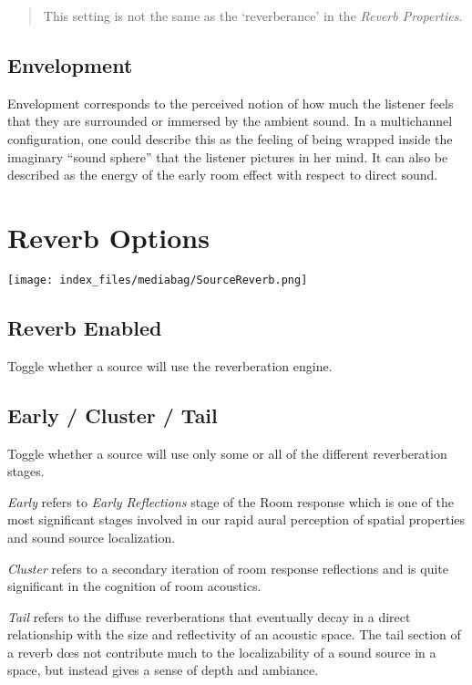 \documentclass[
  letterpaper,
  DIV=11,
  numbers=noendperiod]{scrreport}
\begin{document}
\begin{quote}
This setting is not the same as the `reverberance' in the \emph{Reverb
Properties}.
\end{quote}

\hypertarget{envelopment}{%
\subsection{Envelopment}\label{envelopment}}

Envelopment corresponds to the perceived notion of how much the listener
feels that they are surrounded or immersed by the ambient sound. In a
multichannel configuration, one could describe this as the feeling of
being wrapped inside the imaginary ``sound sphere'' that the listener
pictures in her mind. It can also be described as the energy of the
early room effect with respect to direct sound.

\hypertarget{reverb-options}{%
\section{Reverb Options}\label{reverb-options}}

\texttt{[image: index\_files/mediabag/SourceReverb.png]}

\hypertarget{reverb-enabled}{%
\subsection{Reverb Enabled}\label{reverb-enabled}}

Toggle whether a source will use the reverberation engine.

\hypertarget{early-cluster-tail}{%
\subsection{Early / Cluster / Tail}\label{early-cluster-tail}}

Toggle whether a source will use only some or all of the different
reverberation stages.

\emph{Early} refers to \emph{Early Reflections} stage of the Room
response which is one of the most significant stages involved in our
rapid aural perception of spatial properties and sound source
localization.

\emph{Cluster} refers to a secondary iteration of room response
reflections and is quite significant in the cognition of room acoustics.

\emph{Tail} refers to the diffuse reverberations that eventually decay
in a direct relationship with the size and reflectivity of an acoustic
space. The tail section of a reverb dœs not contribute much to the
localizability of a sound source in a space, but instead gives a sense
of depth and ambiance.
\end{document}
